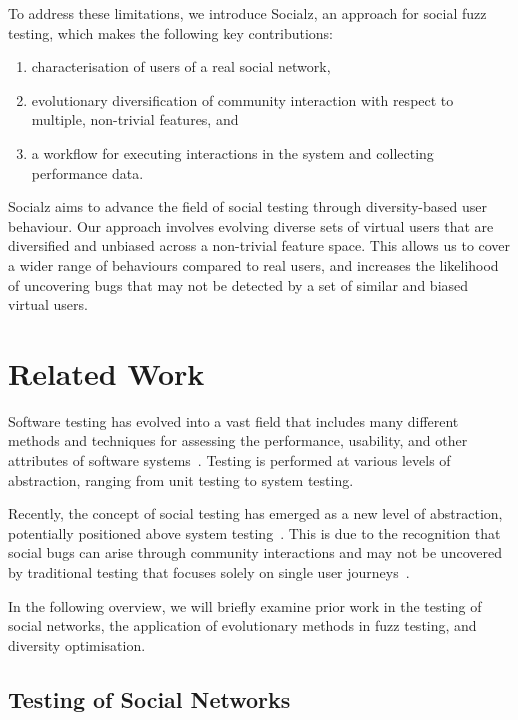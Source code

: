 \documentclass[dvipsnames,format=sigconf,anonymous=False,review=false, balance=false]{acmart}
\begin{document}
To address these limitations, we introduce Socialz, an approach for social fuzz testing, which makes the following key contributions: 


\begin{enumerate}
    \item characterisation of users of a real social network, 
    \item evolutionary diversification of community interaction with respect to multiple, non-trivial features, 
and 
    \item a workflow for executing interactions in the system and collecting performance data.
\end{enumerate}

Socialz aims to advance the field of social testing through diversity-based user behaviour. Our approach involves evolving diverse sets of virtual users that are diversified and unbiased across a non-trivial feature space. This allows us to cover a wider range of behaviours compared to real users, and increases the likelihood of uncovering bugs that may not be detected by a set of similar and biased virtual users. 


\section{Related Work}

Software testing has evolved into a vast field that includes many different methods and techniques for assessing the performance, usability, and other attributes of software systems~\cite{7814898}. Testing is performed at various levels of abstraction, ranging from unit testing to system testing.


Recently, the concept of social testing has emerged as a new level of abstraction, potentially positioned above system testing~\cite{ahlgren2020wes}. This is due to the recognition that social bugs can arise through community interactions and may not be uncovered by traditional testing that focuses solely on single user journeys~\cite{harman2018journeys}. 

In the following overview, we will briefly examine prior work in the testing of social networks, the application of evolutionary methods in fuzz testing, and diversity optimisation.

\subsection{Testing of Social Networks}
\end{document}
